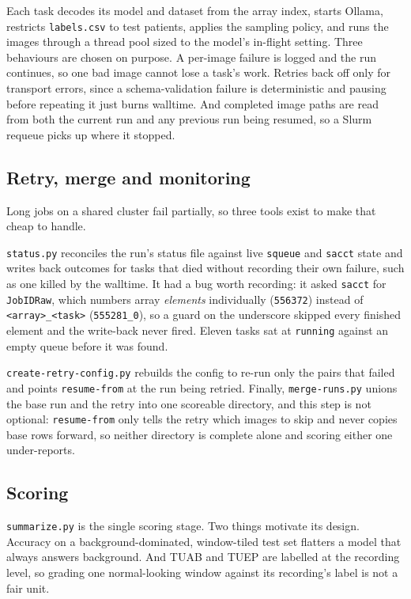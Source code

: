\documentclass[11pt,a4paper]{article}
\newcommand{\file}[1]{{\small\texttt{#1}}}
\begin{document}
Each task decodes its model and dataset from the array index, starts Ollama,
restricts \file{labels.csv} to test patients, applies the sampling policy, and
runs the images through a thread pool sized to the model's in-flight setting.
Three behaviours are chosen on purpose. A per-image failure is logged and the run
continues, so one bad image cannot lose a task's work. Retries back off only for
transport errors, since a schema-validation failure is deterministic and pausing
before repeating it just burns walltime. And completed image paths are read from
both the current run and any previous run being resumed, so a Slurm requeue picks
up where it stopped.

\subsection{Retry, merge and monitoring}

Long jobs on a shared cluster fail partially, so three tools exist to make that
cheap to handle.

\file{status.py} reconciles the run's status file against live \texttt{squeue}
and \texttt{sacct} state and writes back outcomes for tasks that died without
recording their own failure, such as one killed by the walltime. It had a bug
worth recording: it asked \texttt{sacct} for \texttt{JobIDRaw}, which numbers
array \emph{elements} individually (\texttt{556372}) instead of
\texttt{<array>\_<task>} (\texttt{555281\_0}), so a guard on the underscore
skipped every finished element and the write-back never fired. Eleven tasks sat
at \texttt{running} against an empty queue before it was found.

\file{create-retry-config.py} rebuilds the config to re-run only the pairs that
failed and points \texttt{resume-from} at the run being retried. Finally,
\file{merge-runs.py} unions the base run and the retry into one scoreable
directory, and this step is not optional: \texttt{resume-from} only tells the
retry which images to skip and never copies base rows forward, so neither
directory is complete alone and scoring either one under-reports.

\subsection{Scoring}
\label{sec:scoring}

\file{summarize.py} is the single scoring stage. Two things motivate its design.
Accuracy on a background-dominated, window-tiled test set flatters a model that
always answers background. And TUAB and TUEP are labelled at the recording level,
so grading one normal-looking window against its recording's label is not a fair
unit.
\end{document}
